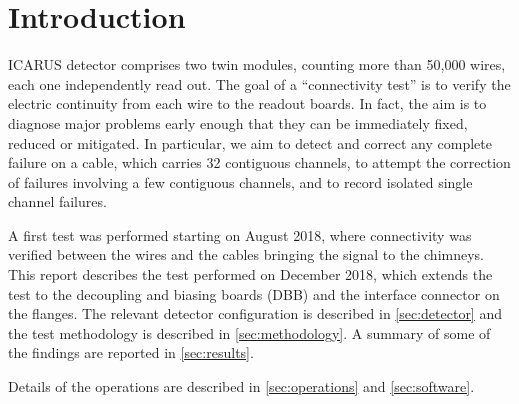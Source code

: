\section{Introduction}
\label{sec:introduction}

ICARUS detector comprises two twin modules, counting more than 50,000
wires\cite{ICARUSTPC}, each one independently read out.
The goal of a ``connectivity test'' is to verify the electric continuity from
each wire to the readout boards. In fact, the aim is to diagnose major problems
early enough that they can be immediately fixed, reduced or mitigated.
In particular, we aim to detect and correct any complete failure on a cable,
which carries 32 contiguous channels, to attempt the correction of failures
involving a few contiguous channels, and to record isolated single channel
failures.

A first test was performed starting on August 2018\cite{ConnTest201808}, where
connectivity was verified between the wires and the cables bringing the signal
to the chimneys. This report describes the test performed on December 2018,
which extends the test to the decoupling and biasing boards (DBB) and the
interface connector on the flanges. The relevant detector configuration is
described in \cref{sec:detector} and the test methodology is described in
\cref{sec:methodology}.
A summary of some of the findings are reported in \cref{sec:results}.

Details of the operations are described in \cref{sec:operations} and
\cref{sec:software}.

